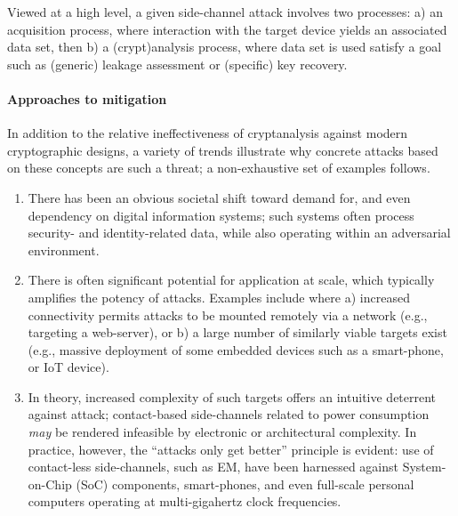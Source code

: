
Viewed at a high level, a given side-channel attack involves two processes:
a) an acquisition    process, 
   where interaction with the target device yields an associated data set,
   then
b) a (crypt)analysis process,
   where data set is used satisfy a goal such as 
    (generic) leakage assessment
   or 
   (specific) key recovery.


\paragraph{Approaches to mitigation}


In addition to the relative ineffectiveness of cryptanalysis against modern
cryptographic designs, a variety of trends illustrate why concrete attacks
based on these concepts are such a threat; a non-exhaustive set of examples
follows.

\begin{enumerate}

\item There has been an obvious societal shift toward demand for, and even
      dependency on digital information systems; such systems often process
      security- and identity-related data, while also operating within an
      adversarial environment.

\item There is often significant potential for application at scale, which
      typically amplifies the potency of attacks.  Examples include where
      a) increased connectivity permits attacks to be mounted remotely via
         a network (e.g., targeting a web-server),
         or
      b) a large number of similarly viable targets exist (e.g., massive
         deployment of some embedded devices such as a smart-phone, or IoT
         device).

\item In   theory,
      increased complexity   of      such targets
      offers an intuitive deterrent against attack;
      contact-based side-channels related to power consumption {\em may} be
      rendered infeasible by electronic or architectural complexity.
      In practice,
      however, the ``attacks only get better'' principle is evident: use of
      contact-less side-channels, such as EM, have been harnessed against
      System-on-Chip (SoC) components, 
      smart-phones,
      and even
      full-scale personal computers
      operating at multi-gigahertz clock frequencies.

\end{enumerate}


